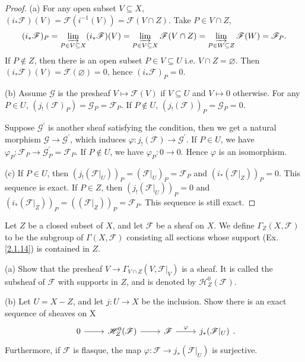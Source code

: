 \begin{proof}
	(a) For any open subset $V \subseteq X$, $(i_{*}\mathscr{F})(V) = \mathscr{F}(i^{-1}(V)) = \mathscr{F}(V \cap Z)$. Take $P \in V \cap Z$, $$(i_{*}\mathscr{F})_{P} = \varinjlim_{P \in V\subseteq X}(i_{*} \mathscr{F})(V) = \varinjlim_{P \in V\subseteq X} \mathscr{F}(V \cap Z) = \varinjlim_{P \in W\subseteq Z} \mathscr{F}(W) = \mathscr{F}_{P}.$$ If $P \notin Z$, then there is an open subset $P \in V \subseteq U$ i.e. $V \cap Z = \varnothing$. Then $(i_{*} \mathscr{F})(V)=\mathscr{F}(\varnothing) = 0$, hence $(i_*\mathscr{F})_P = 0$.
	
	(b) Assume $\mathscr{G}$ is the presheaf $V \mapsto \mathscr{F}(V)$ if $V \subseteq U$ and $V \mapsto 0$ otherwise. For any $P \in U$, $(j_{!}(\mathscr{F})_{P})=\mathscr{G}_{P}=\mathscr{F}_{P}$. If $P \notin U$, $(j_{!}(\mathscr{F}))_{P}=\mathscr{G}_{P}=0$.
	
	Suppose $\mathscr{G}^{'}$ is another sheaf satisfying the condition, then we get a natural morphism $\mathscr{G} \to \mathscr{G}^{'}$, which induces $\varphi : j_{!}(\mathscr{F}) \to \mathscr{G}^{'}$. If $P \in U$, we have $\varphi_{P}: \mathscr{F}_{P} \to \mathscr{G}^{'}_{P}=\mathscr{F}_{P}$. If $P \notin U$, we have $\varphi_P:0 \to 0$. Hence $\varphi$ is an isomorphism.
	
	(c) If $P \in U$, then $(j_{!}(\mathscr{F}|_{U}))_{P} = (\mathscr{F}|_{U})_{P} = \mathscr{F}_{P}$ and $(i_{*}(\mathscr{F}|_{Z}))_{P} = 0$. This sequence is exact. If $P \in Z$, then $(j_{!}(\mathscr{F}|_{U}))_{P}=0$ and $(i_{*}(\mathscr{F}|_{Z}))_{P} = ((\mathscr{F}|_{Z}))_{P} = \mathscr{F}_{P}$. This sequence is still exact.
\end{proof}
\begin{exe}
	\label{2.1.20}
	Let $Z$ be a closed subset of $X$, and let $\mathscr{F}$ be a sheaf on $X$. We define $\Gamma_Z(X,\mathscr{F})$ to be the subgroup of $\Gamma(X,\mathscr{F})$ consisting all sections whose support \textup{(Ex. \ref{2.1.14})} is contained in $Z$.
	
	(a) Show that the presheaf $V\to\Gamma_{V\cap Z}(V,\mathscr{F}|_V)$ is a sheaf. It is called the subsheaf of $\mathscr{F}$ with supports in $Z$, and is denoted by $\mathscr{H}_Z^0(\mathscr{F})$.
	
	(b) Let $U=X-Z$, and let $j:U\to X$ be the inclusion. Show there is an exact sequence of sheaves on X
	\begin{equation*}
		\begin{tikzcd}
			0 \arrow[r] & \mathscr{H}_Z^0(\mathscr{F}) \arrow[r] & \mathscr{F} \arrow[r, "\varphi"] & j_*(\mathscr{F}|_U)
		\end{tikzcd}.
	\end{equation*}
	Furthermore, if $\mathscr{F}$ is flasque, the map $\varphi:\mathscr{F}\to j_*(\mathscr{F}|_U)$ is surjective.
\end{exe}

